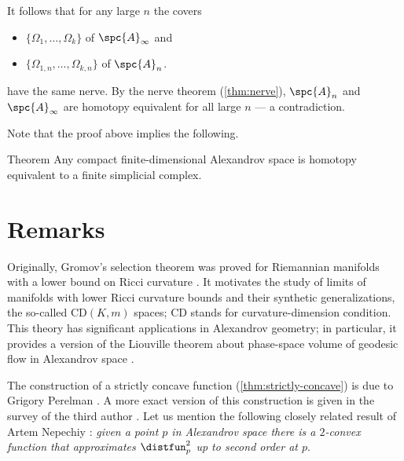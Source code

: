 It follows that for any large $n$ the covers 
\begin{itemize}
\item $\{\Omega_{1},\dots,\Omega_{k}\}$ of $\spc{A}_\infty$ and 
\item $\{\Omega_{1,n},\dots,\Omega_{k,n}\}$ of $\spc{A}_n$.
\end{itemize}
have the same nerve.
By the nerve theorem (\ref{thm:nerve}), $\spc{A}_n$ and $\spc{A}_\infty$ are homotopy equivalent for all large $n$ --- a contradiction.
\qeds

Note that the proof above implies the following.

\begin{thm}{Theorem}\label{thm:finite-dim-hom-simplicial}
Any compact finite-dimensional Alexandrov space is homotopy equivalent to a finite simplicial complex.
\end{thm}

\section{Remarks}

Originally, Gromov's selection theorem was proved for Riemannian manifolds with a lower bound on Ricci curvature \cite{gromov1981}.
It motivates the study of limits of manifolds with lower Ricci curvature bounds and their synthetic generalizations, the so-called $\mathrm{CD}(K,m)$ spaces; $\mathrm{CD}$ stands for curvature-dimension condition.
This theory has significant applications in Alexandrov geometry;
in particular, it provides a version of the Liouville theorem about phase-space volume of geodesic flow in Alexandrov space \cite{brue-mondino-semola}.

The construction of a strictly concave function (\ref{thm:strictly-concave}) is due to Grigory Perelman \cite{perelman1993,perelman-petrunin}.
A more exact version of this construction is given in the survey of the third author \cite[7.2]{petrunin:survey}.
Let us mention the following closely related result of Artem Nepechiy \cite{nepechiy2019}:
\textit{given a point $p$ in Alexandrov space there is a $2$-convex function that approximates $\distfun_p^2$ up to second order at $p$}.

